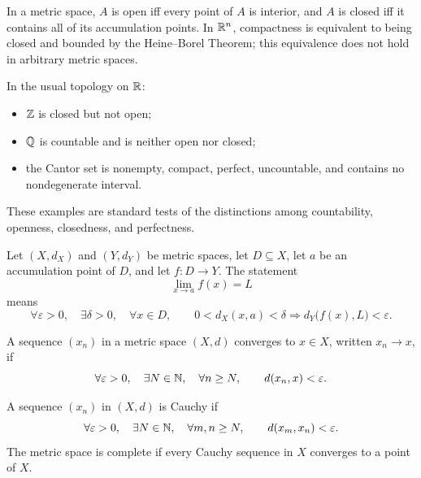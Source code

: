 \begin{definition}
        In a metric space, $A$ is open iff every point of $A$ is interior, and
        $A$ is closed iff it contains all of its accumulation points. In $\mathbb{R}^n$,
        compactness is equivalent to being closed and bounded by the
        Heine--Borel Theorem; this equivalence does not hold in arbitrary metric
        spaces.
    \end{definition}

    \begin{fact}
        In the usual topology on $\mathbb{R}$:
        \begin{itemize}
            \item $\mathbb{Z}$ is closed but not open;
            \item $\mathbb{Q}$ is countable and is neither open nor closed;
            \item the Cantor set is nonempty, compact, perfect, uncountable, and
                  contains no nondegenerate interval.
        \end{itemize}
        These examples are standard tests of the distinctions among countability,
        openness, closedness, and perfectness.
    \end{fact}

    \begin{definition}
        Let $(X,d_X)$ and $(Y,d_Y)$ be metric spaces, let $D\subseteq X$, let
        $a$ be an accumulation point of $D$, and let $f:D\to Y$. The statement
        \[
            \lim\limits_{x\to a}f(x)=L
        \]
        means
        \[
            \forall\varepsilon>0,
            \quad
            \exists\delta>0,
            \quad
            \forall x\in D,
            \qquad
            0<d_X(x,a)<\delta
            \Rightarrow
            d_Y\bigl(f(x),L\bigr)<\varepsilon.
        \]
    \end{definition}

    \begin{definition}
        A sequence $(x_n)$ in a metric space $(X,d)$ converges to $x\in X$,
        written $x_n\to x$, if
        \[
            \forall\varepsilon>0,
            \quad
            \exists N\in\mathbb{N},
            \quad
            \forall n\geq N,
            \qquad
            d(x_n,x)<\varepsilon.
        \]
    \end{definition}

    \begin{definition}
        A sequence $(x_n)$ in $(X,d)$ is Cauchy if
        \[
            \forall\varepsilon>0,
            \quad
            \exists N\in\mathbb{N},
            \quad
            \forall m,n\geq N,
            \qquad
            d(x_m,x_n)<\varepsilon.
        \]
        The metric space is complete if every Cauchy sequence in $X$ converges
        to a point of $X$.
    \end{definition}

